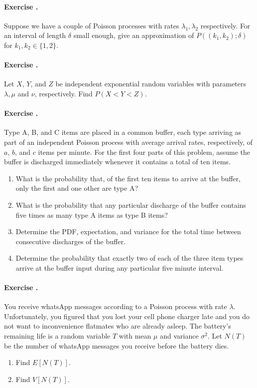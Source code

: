 \documentclass[twocolumn,12pt,a4paper]{article}
\newcounter{num}  %
\begin{document}
	
	
	\paragraph{Exercise \thenum.}
	Suppose we have a couple of Poisson processes with rates $\lambda_1, \lambda_2$ respectively. 
	For an interval of length $ \delta$ small enough, give an approximation of $P((k_1,k_2);\delta)$ for $k_1,k_2\in\{1,2\}$.
	
	
	\paragraph{Exercise \thenum.}
	Let $X$, $Y$, and $Z$ be independent exponential random variables with parameters $\lambda, \mu$ and $\nu$,
	respectively. Find $P(X < Y < Z)$.
	
	
	\paragraph{Exercise \thenum.}
	Type A, B, and C items are placed in a common buffer, each type arriving as part of an independent Poisson process with average arrival rates, respectively, of $ a $, $ b $, and $ c $ items per minute. For the first four parts of this problem, assume the buffer is discharged immediately whenever it contains a total of ten items.
	
	\begin{enumerate}
		\item What is the probability that, of the first ten items to arrive at the buffer, only the first and one other are type A?
		\item What is the probability that any particular discharge of the buffer contains five times as many type A items as type B items?
		\item Determine the PDF, expectation, and variance for the total time between consecutive discharges of the buffer.
		\item Determine the probability that exactly two of each of the three item types arrive at the buffer input during any particular five minute interval.
	\end{enumerate}
	
	
	\paragraph{Exercise \thenum.}
	You receive whatsApp messages according to a Poisson process with rate $ \lambda$. 
	Unfortunately, you figured that you lost your cell phone charger late and you do not want to inconvenience flatmates who are already asleep.
	The battery's remaining life is a random variable $T$ with mean $\mu$ and variance $\sigma^2$. 
	Let $N(T)$ be the number of whatsApp messages you receive before the battery dies.
	\begin{enumerate}
		\item Find $ E[N(T)]$.
		\item Find $V[N(T)]$.
	\end{enumerate}
	
\end{document}
